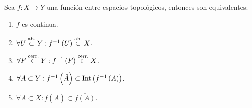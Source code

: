 \begin{prop}
Sea $f:X\rightarrow Y$ una función entre espacios topológicos, entonces son equivalentes:
\begin{enumerate}
    \item $f$ es continua.
    \item $\forall U \stackrel{\text{ab.}}{\subset} Y : f^{-1}\left( U \right) \stackrel{\text{ab.}}{\subset} X$.
    \item $\forall F \stackrel{\text{cerr.}}{\subset} Y : f^{-1}\left( F \right) \stackrel{\text{cerr.}}{\subset} X$.
    \item $\forall A \subset Y : f^{-1}\left( \mathring{A} \right) \subset \operatorname{Int}\left( f^{-1}\left( A \right) \right)$.
    \item $\forall A \subset X : f\left( \overline{A} \right) \subset \overline{f\left( A \right)}$.
\end{enumerate}
\end{prop}
